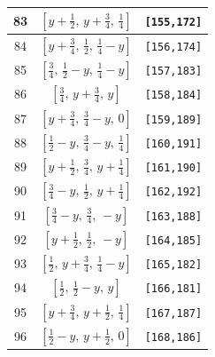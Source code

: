 \documentclass[fleqn,8pt]{jsarticle}
\begin{document}
\begin{longtable}{ccc}
83 & $\left[ y + \frac{1}{2},\, y + \frac{3}{4},\, \frac{1}{4} \right]$ & {\tt [155,172]} \\ \hline
84 & $\left[ y + \frac{3}{4},\, \frac{1}{2},\, \frac{1}{4} - y \right]$ & {\tt [156,174]} \\ \hline
85 & $\left[ \frac{3}{4},\, \frac{1}{2} - y,\, \frac{1}{4} - y \right]$ & {\tt [157,183]} \\ \hline
86 & $\left[ \frac{3}{4},\, y + \frac{3}{4},\, y \right]$ & {\tt [158,184]} \\ \hline
87 & $\left[ y + \frac{3}{4},\, \frac{3}{4} - y,\, 0 \right]$ & {\tt [159,189]} \\ \hline
88 & $\left[ \frac{1}{2} - y,\, \frac{3}{4} - y,\, \frac{1}{4} \right]$ & {\tt [160,191]} \\ \hline
89 & $\left[ y + \frac{1}{2},\, \frac{3}{4},\, y + \frac{1}{4} \right]$ & {\tt [161,190]} \\ \hline
90 & $\left[ \frac{3}{4} - y,\, \frac{1}{2},\, y + \frac{1}{4} \right]$ & {\tt [162,192]} \\ \hline
91 & $\left[ \frac{3}{4} - y,\, \frac{3}{4},\, - y \right]$ & {\tt [163,188]} \\ \hline
92 & $\left[ y + \frac{1}{2},\, \frac{1}{2},\, - y \right]$ & {\tt [164,185]} \\ \hline
93 & $\left[ \frac{1}{2},\, y + \frac{3}{4},\, \frac{1}{4} - y \right]$ & {\tt [165,182]} \\ \hline
94 & $\left[ \frac{1}{2},\, \frac{1}{2} - y,\, y \right]$ & {\tt [166,181]} \\ \hline
95 & $\left[ y + \frac{3}{4},\, y + \frac{1}{2},\, \frac{1}{4} \right]$ & {\tt [167,187]} \\ \hline
96 & $\left[ \frac{1}{2} - y,\, y + \frac{1}{2},\, 0 \right]$ & {\tt [168,186]} \\
\end{longtable}
\renewcommand{\arraystretch}{1.2}
\end{document}
